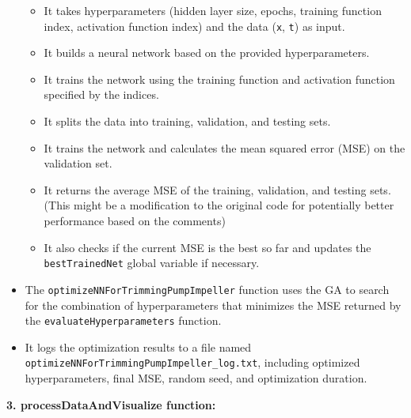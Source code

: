 \documentclass[
  super,
  review,
  3p]{elsarticle}
\providecommand{\tightlist}{%
  \setlength{\itemsep}{0pt}\setlength{\parskip}{0pt}}\usepackage{longtable,booktabs,array}
\begin{document}
\begin{itemize}
  \begin{itemize}
  \tightlist
  \item
    It takes hyperparameters (hidden layer size, epochs, training
    function index, activation function index) and the data (\texttt{x},
    \texttt{t}) as input.
  \item
    It builds a neural network based on the provided hyperparameters.
  \item
    It trains the network using the training function and activation
    function specified by the indices.
  \item
    It splits the data into training, validation, and testing sets.
  \item
    It trains the network and calculates the mean squared error (MSE) on
    the validation set.
  \item
    It returns the average MSE of the training, validation, and testing
    sets. (This might be a modification to the original code for
    potentially better performance based on the comments)
  \item
    It also checks if the current MSE is the best so far and updates the
    \texttt{bestTrainedNet} global variable if necessary.
  \end{itemize}
\item
  The \texttt{optimizeNNForTrimmingPumpImpeller} function uses the GA to
  search for the combination of hyperparameters that minimizes the MSE
  returned by the \texttt{evaluateHyperparameters} function.
\item
  It logs the optimization results to a file named
  \texttt{optimizeNNForTrimmingPumpImpeller\_log.txt}, including
  optimized hyperparameters, final MSE, random seed, and optimization
  duration.
\end{itemize}

\textbf{3. processDataAndVisualize function:}
\end{document}
